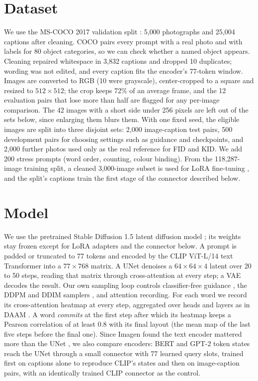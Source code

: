 \documentclass[conference]{IEEEtran}
\begin{document}
\section{Dataset}
We use the MS-COCO 2017 validation split \cite{coco}: 5{,}000 photographs and 25{,}004 captions after cleaning. COCO pairs every prompt with a real photo and with labels for 80 object categories, so we can check whether a named object appears. Cleaning repaired whitespace in 3{,}832 captions and dropped 10 duplicates; wording was not edited, and every caption fits the encoder's 77-token window. Images are converted to RGB (10 were grayscale), center-cropped to a square and resized to $512\times512$; the crop keeps 72\% of an average frame, and the 12 evaluation pairs that lose more than half are flagged for any per-image comparison. The 42 images with a short side under 256 pixels are left out of the sets below, since enlarging them blurs them. With one fixed seed, the eligible images are split into three disjoint sets: 2{,}000 image-caption test pairs, 500 development pairs for choosing settings such as guidance and checkpoints, and 2{,}000 further photos used only as the real reference for FID and KID. We add 200 stress prompts (word order, counting, colour binding). From the 118{,}287-image training split, a cleaned 3{,}000-image subset is used for LoRA fine-tuning \cite{lora}, and the split's captions train the first stage of the connector described below.

\section{Model}
We use the pretrained Stable Diffusion 1.5 latent diffusion model \cite{ldm}; its weights stay frozen except for LoRA adapters and the connector below. A prompt is padded or truncated to 77 tokens and encoded by the CLIP ViT-L/14 text Transformer \cite{clip} into a $77\times768$ matrix. A UNet denoises a $64\times64\times4$ latent over 20 to 50 steps, reading that matrix through cross-attention at every step; a VAE decodes the result. Our own sampling loop controls classifier-free guidance \cite{cfg}, the DDPM and DDIM samplers \cite{ddpm,ddim}, and attention recording. For each word we record its cross-attention heatmap at every step, aggregated over heads and layers as in DAAM \cite{daam}. A word \emph{commits} at the first step after which its heatmap keeps a Pearson correlation of at least 0.8 with its final layout (the mean map of the last five steps before the final one). Since Imagen found the text encoder mattered more than the UNet \cite{imagen}, we also compare encoders: BERT \cite{bert} and GPT-2 \cite{gpt2} token states reach the UNet through a small connector with 77 learned query slots, trained first on captions alone to reproduce CLIP's states and then on image-caption pairs, with an identically trained CLIP connector as the control.
\end{document}
